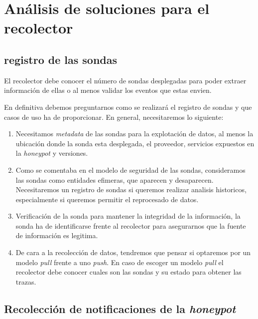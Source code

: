 \section{Análisis de soluciones para el recolector}




\subsection{registro de las sondas}

El recolector debe conocer el número de sondas desplegadas para poder extraer información de ellas o al menos validar
los eventos que estas envien.

En definitiva debemos preguntarnos como se realizará el registro de sondas y que casos de uso ha de proporcionar. En general, necesitaremos lo siguiente:

\begin{enumerate}
    \item Necesitamos \emph{metadata} de las sondas para la explotación de datos, al menos la ubicación donde la sonda esta desplegada, el proveedor, servicios expuestos en la \emph{honeypot} y versiones.
    \item Como se comentaba en el modelo de seguridad de las sondas, consideramos las sondas como entidades efimeras, que aparecen y desaparecen. 
    Necesitaremos un registro de sondas si queremos realizar analisis historicos, especialmente si queremos permitir el reprocesado de datos.
    \item Verificación de la sonda para mantener la integridad de la información, la sonda ha de identificarse frente al recolector para asegurarnos que la fuente de información es legitima.
    \item De cara a la recolección de datos, tendremos que pensar si optaremos por un modelo \emph{pull} frente a uno \emph{push}. En caso de escoger un modelo \emph{pull} el recolector debe conocer
    cuales son las sondas y su estado para obtener las trazas.
\end{enumerate}

\subsection{Recolección de notificaciones de la \emph{honeypot}}

